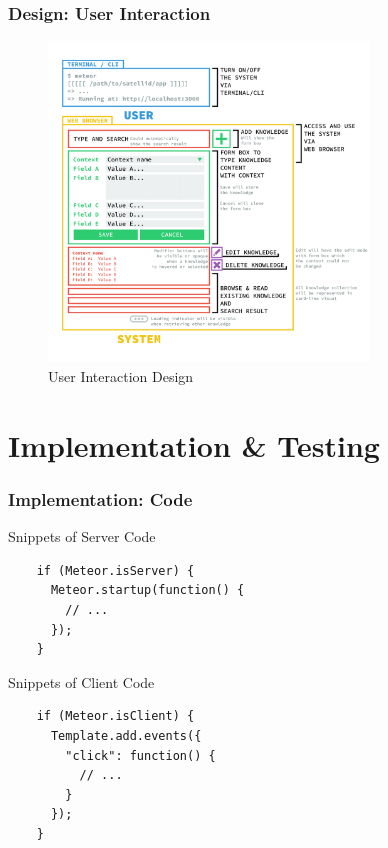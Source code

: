 \documentclass[10pt, compress]{beamer}
\begin{document}

\begin{frame}[fragile]
  \frametitle{Design: User Interaction}

  \begin{figure}[ht]
    \centering
    \vspace{-25pt}
    \includegraphics[height=8.5cm]{include/satellid-app-uix.png}
    \vspace{-10pt}
    \caption{User Interaction Design}
    \label{fig:satellid-app-uix}
  \end{figure}

\end{frame}


\section{Implementation \& Testing}


\begin{frame}[fragile]
  \frametitle{Implementation: Code}

  Snippets of Server Code
  \begin{verbatim}
    if (Meteor.isServer) {
      Meteor.startup(function() {
        // ...
      });
    }
  \end{verbatim}

  Snippets of Client Code
  \begin{verbatim}
    if (Meteor.isClient) {
      Template.add.events({
        "click": function() {
          // ...
        }
      });
    }
  \end{verbatim}

\end{frame}
\end{document}
